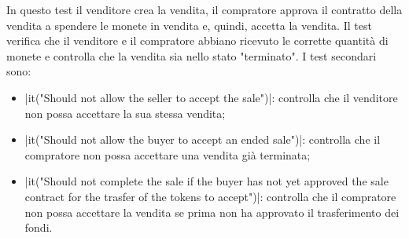 \documentclass[a4paper]{article}
\begin{document}
        In questo test il venditore crea la vendita, il compratore approva il contratto della vendita a spendere le monete in vendita e, quindi, accetta la vendita. Il test verifica che il venditore e il compratore abbiano ricevuto le corrette quantità di monete e controlla che la vendita sia nello stato "terminato".
        I test secondari sono:
        \begin{itemize}
          \item \spverb|it("Should not allow the seller to accept the sale")|: controlla che il venditore non possa accettare la sua stessa vendita;
          \item \spverb|it("Should not allow the buyer to accept an ended sale")|: \newline controlla che il compratore non possa accettare una vendita già terminata;
          \item \spverb|it("Should not complete the sale if the buyer has not yet    approved the sale contract for the trasfer of the tokens to  accept")|: controlla che il compratore non possa accettare la vendita se prima non ha approvato il trasferimento dei fondi.
        \end{itemize}
\end{document}
